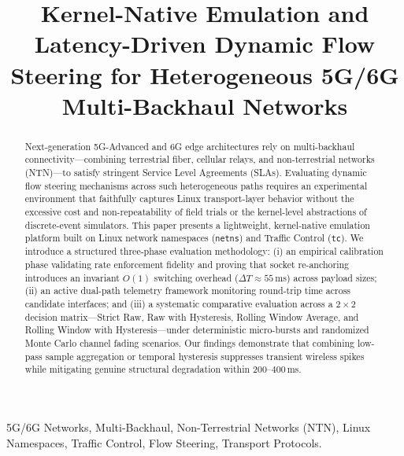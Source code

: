 \documentclass[conference]{IEEEtran}
\begin{document}
\title{Kernel-Native Emulation and Latency-Driven Dynamic Flow Steering for Heterogeneous 5G/6G Multi-Backhaul Networks}

\author{
}

\maketitle

\begin{abstract}
Next-generation 5G-Advanced and 6G edge architectures rely on multi-backhaul connectivity---combining terrestrial fiber, cellular relays, and non-terrestrial networks (NTN)---to satisfy stringent Service Level Agreements (SLAs). Evaluating dynamic flow steering mechanisms across such heterogeneous paths requires an experimental environment that faithfully captures Linux transport-layer behavior without the excessive cost and non-repeatability of field trials or the kernel-level abstractions of discrete-event simulators. This paper presents a lightweight, kernel-native emulation platform built on Linux network namespaces (\texttt{netns}) and Traffic Control (\texttt{tc}). We introduce a structured three-phase evaluation methodology: (i) an empirical calibration phase validating rate enforcement fidelity and proving that socket re-anchoring introduces an invariant $O(1)$ switching overhead ($\Delta T \approx 55$\,ms) across payload sizes; (ii) an active dual-path telemetry framework monitoring round-trip time across candidate interfaces; and (iii) a systematic comparative evaluation across a $2 \times 2$ decision matrix---Strict Raw, Raw with Hysteresis, Rolling Window Average, and Rolling Window with Hysteresis---under deterministic micro-bursts and randomized Monte Carlo channel fading scenarios. Our findings demonstrate that combining low-pass sample aggregation or temporal hysteresis suppresses transient wireless spikes while mitigating genuine structural degradation within $200$--$400$\,ms.
\end{abstract}

\begin{IEEEkeywords}
5G/6G Networks, Multi-Backhaul, Non-Terrestrial Networks (NTN), Linux Namespaces, Traffic Control, Flow Steering, Transport Protocols.
\end{IEEEkeywords}
\end{document}
